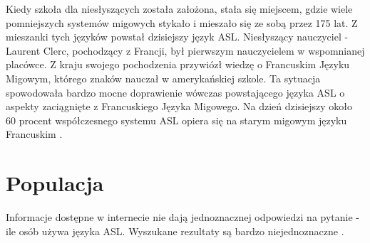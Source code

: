 \documentclass[a4paper,12pt,oneside]{book} %
\begin{document}
Kiedy szkoła dla niesłyszących została założona, stała się miejscem, gdzie wiele pomniejszych systemów migowych stykało i mieszało się ze sobą przez 175 lat. Z mieszanki tych języków powstał dzisiejszy język ASL. Niesłyszący nauczyciel - Laurent Clerc, pochodzący z Francji, był pierwszym nauczycielem w wspomnianej placówce. Z kraju swojego pochodzenia przywiózł wiedzę o Francuskim Języku Migowym, którego znaków nauczał w amerykańskiej szkole. Ta sytuacja spowodowała bardzo mocne doprawienie wówczas powstającego języka ASL o aspekty zaciągnięte z Francuskiego Języka Migowego. Na dzień dzisiejszy około 60 procent współczesnego systemu ASL opiera się na starym migowym języku Francuskim \cite{bahan}.


\section{Populacja}
Informacje dostępne w internecie nie dają jednoznacznej odpowiedzi na pytanie - ile osób używa języka ASL. Wyszukane rezultaty są bardzo niejednoznaczne \cite{population}.
\end{document}
